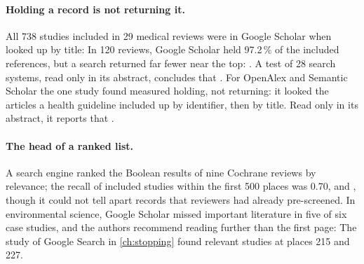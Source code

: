 \paragraph{Holding a record is not returning it.}
All 738 studies included in 29 medical reviews were in Google Scholar
when looked up by title: 
In 120 reviews, Google Scholar held 97.2\,\% of the included references,
but a search returned far fewer near the top:
.
A test of 28 search systems, read only in its abstract, concludes that
.
For OpenAlex and Semantic Scholar the one study found measured holding,
not returning: it looked the articles a health guideline included up by
identifier, then by title.
Read only in its abstract, it reports that .

\paragraph{The head of a ranked list.}
A search engine ranked the Boolean results of nine Cochrane reviews by
relevance; the recall of included studies within the first 500 places
was 0.70, and , though it could not tell apart records that reviewers had
already pre-screened.
In environmental science, Google Scholar missed important literature in
five of six case studies, and the authors recommend reading further than
the first page: 
The study of Google Search in \cref{ch:stopping} found relevant studies at
places 215 and 227.

